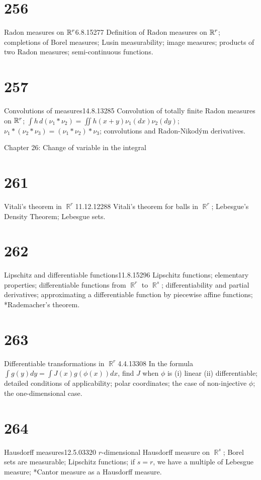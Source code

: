\section{256}{Radon measures on $\Bbb{R}^r$}{6.8.15}{277}{}
{Definition of Radon measures on $\Bbb{R}^r$;  completions of Borel
measures;  Lusin measurability;  image measures;
products of two Radon measures;  semi-continuous functions.}

\section{257}{Convolutions of measures}{14.8.13}{285}{}
{Convolution of totally finite Radon measures on $\Bbb{R}^r$;
${\int}h\,d(\nu_1*\nu_2)={\iint}h(x+y)\nu_1(dx)\nu_2(dy)$;
$\nu_1*(\nu_2*\nu_3)=(\nu_1*\nu_2)*\nu_3$;  convolutions and
Radon-Nikod\'ym derivatives.}


 Chapter 26:  Change of variable in the integral


\section{261}{Vitali's theorem in $\BbbR^r$}{11.12.12}{288}{}
{Vitali's theorem for balls in $\BbbR^r$;  Lebesgue's Density
Theorem;  Lebesgue sets.}

\section{262}{Lipschitz and differentiable functions}{11.8.15}{296}{}
{Lipschitz functions;  elementary properties;  differentiable
functions from $\BbbR^r$ to $\BbbR^s$;  differentiability and partial
derivatives;  approximating a differentiable function by piecewise 
affine functions;  *Rademacher's theorem.}

\section{263}{Differentiable transformations in $\BbbR^r$}{4.4.13}{308}{}
{In the formula ${\int}g(y)dy={\int}J(x)g(\phi(x))dx$, find $J$ when
$\phi$ is (i) linear (ii) differentiable;  detailed conditions of
applicability;  polar coordinates;  the case of non-injective $\phi$;
the one-dimensional case.}

\section{264}{Hausdorff measures}{12.5.03}{320}{}
{$r$-dimensional Hausdorff measure on $\BbbR^s$;  Borel sets are
measurable;  Lipschitz functions;  if $s=r$, we have a multiple of
Lebesgue measure;  *Cantor measure as a Hausdorff measure.}

